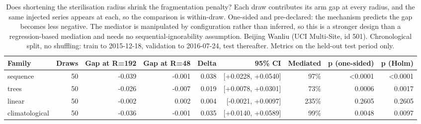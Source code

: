 \begin{table}[htbp]
\caption{Does shortening the sterilisation radius shrink the fragmentation penalty? Each draw contributes its arm gap at every radius, and the same injected series appears at each, so the comparison is within-draw. One-sided and pre-declared: the mechanism predicts the gap becomes less negative. The mediator is manipulated by configuration rather than inferred, so this is a stronger design than a regression-based mediation and needs no sequential-ignorability assumption. Beijing Wanliu (UCI Multi-Site, id 501). Chronological split, no shuffling: train to 2015-12-18, validation to 2016-07-24, test thereafter. Metrics on the held-out test period only.}
\label{tab:mediation_test}
\begin{tabular}{lrrrrrrrr}
\toprule
Family & Draws & Gap at R=192 & Gap at R=48 & Delta & 95\% CI & Mediated & p (one-sided) & p (Holm) \\
\midrule
sequence & 50 & -0.039 & -0.001 & 0.038 & [+0.0228, +0.0540] & 97\% & <0.0001 & <0.0001 \\
trees & 50 & -0.026 & -0.007 & 0.019 & [+0.0078, +0.0301] & 73\% & 0.0006 & 0.0017 \\
linear & 50 & -0.002 & 0.002 & 0.004 & [-0.0021, +0.0097] & 235\% & 0.2605 & 0.2605 \\
climatological & 50 & -0.036 & -0.001 & 0.035 & [+0.0140, +0.0589] & 99\% & 0.0048 & 0.0097 \\
\bottomrule
\end{tabular}
\end{table}
